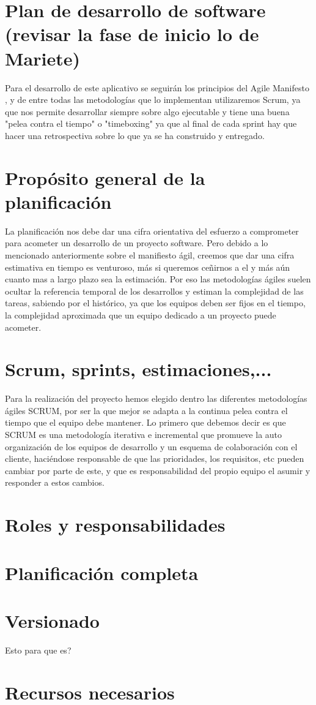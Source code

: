 \documentclass[../pfc.tex]{subfiles}
\begin{document}
	
	\section{Plan de desarrollo de software (revisar la fase de inicio lo de Mariete)}
	
	Para el desarrollo de este aplicativo se seguirán los principios del Agile Manifesto \cite{agile}, y de entre todas las metodologías que lo implementan utilizaremos Scrum, ya que nos permite desarrollar siempre sobre algo ejecutable y tiene una buena "pelea contra el tiempo" o "timeboxing" ya que al final de cada sprint hay que hacer una retrospectiva sobre lo que ya se ha construido y entregado.

	\section{Propósito general de la planificación}
	
	La planificación nos debe dar una cifra orientativa del esfuerzo a comprometer para acometer un desarrollo de un proyecto software. Pero debido a lo mencionado anteriormente sobre el manifiesto ágil, creemos que dar una cifra estimativa en tiempo es venturoso, más si queremos ceñirnos a el y más aún cuanto mas a largo plazo sea la estimación. Por eso las metodologías ágiles suelen ocultar la referencia temporal de los desarrollos y estiman la complejidad de las tareas, sabiendo por el histórico, ya que los equipos deben ser fijos en el tiempo, la complejidad aproximada que un equipo dedicado a un proyecto puede acometer. 
	
	\section{Scrum, sprints, estimaciones,... }
	
	Para la realización del proyecto hemos elegido dentro las diferentes metodologías ágiles SCRUM, por ser la que mejor se adapta a la continua pelea contra el tiempo que el equipo debe mantener. 
	Lo primero que debemos decir es que SCRUM es una metodología iterativa e incremental que promueve la auto organización de los equipos de desarrollo y un esquema de colaboración con el cliente, haciéndose responsable de que las prioridades, los requisitos, etc pueden cambiar por parte de este, y que es responsabilidad del propio equipo el asumir y responder a estos cambios. 
	
	
	\section{Roles y responsabilidades}
	
	\section{Planificación completa}
	
	\section{Versionado}
	
	Esto para que es?
	
	\section{Recursos necesarios}


	
\end{document}
